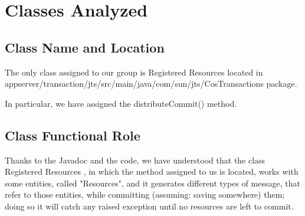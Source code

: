 \section{Classes Analyzed}
\subsection{Class Name and Location}
	The only class assigned to our group is \ttfamily Registered Resources \normalfont located in \ttfamily appserver/transaction/jts/src/main/java/com/sun/jts/CosTransactions \normalfont package.
	
	In particular, we have assigned the \ttfamily distributeCommit() \normalfont method.
	
\subsection{Class Functional Role}
	Thanks to the Javadoc and the code, we have understood that the class \ttfamily Registered Resources \normalfont , in which the method assigned to us is located, works with some entities, called "Resources", and it generates different types of message, that refer to those entities, while committing (assuming: saving somewhere) them; doing so it will catch any raised exception until no resources are left to commit.